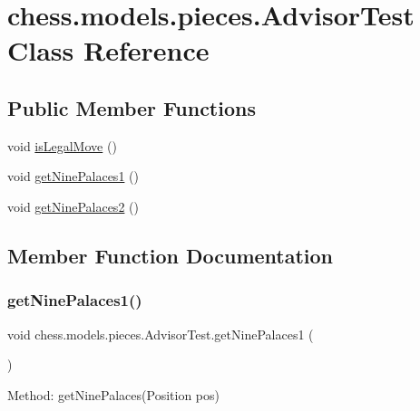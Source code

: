 \hypertarget{classchess_1_1models_1_1pieces_1_1_advisor_test}{}\section{chess.\+models.\+pieces.\+Advisor\+Test Class Reference}
\label{classchess_1_1models_1_1pieces_1_1_advisor_test}
\subsection*{Public Member Functions}
\begin{DoxyCompactItemize}
\item 
void \mbox{\hyperlink{classchess_1_1models_1_1pieces_1_1_advisor_test_a865ff283ac107e64d2d27044ff25d02e}{is\+Legal\+Move}} ()
\item 
void \mbox{\hyperlink{classchess_1_1models_1_1pieces_1_1_advisor_test_a2ad02e014939d5e49e8cead14fd2eed5}{get\+Nine\+Palaces1}} ()
\item 
void \mbox{\hyperlink{classchess_1_1models_1_1pieces_1_1_advisor_test_aaa1de333725dbd1fb065c71272d9d555}{get\+Nine\+Palaces2}} ()
\end{DoxyCompactItemize}


\subsection{Member Function Documentation}
\mbox{\label{classchess_1_1models_1_1pieces_1_1_advisor_test_a2ad02e014939d5e49e8cead14fd2eed5}} 
\subsubsection{\texorpdfstring{get\+Nine\+Palaces1()}{getNinePalaces1()}}
{\footnotesize\ttfamily void chess.\+models.\+pieces.\+Advisor\+Test.\+get\+Nine\+Palaces1 (\begin{DoxyParamCaption}{ }\end{DoxyParamCaption})}

Method\+: get\+Nine\+Palaces(\+Position pos) \mbox{\label{classchess_1_1models_1_1pieces_1_1_advisor_test_aaa1de333725dbd1fb065c71272d9d555}} 

